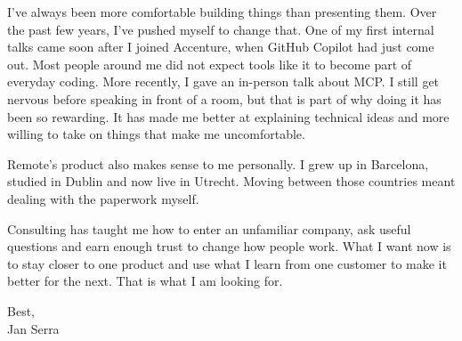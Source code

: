 \documentclass[letterpaper,11pt]{article}
\begin{document}
I've always been more comfortable building things than presenting them. Over the past few years, I've pushed myself to change that. One of my first internal talks came soon after I joined Accenture, when GitHub Copilot had just come out. Most people around me did not expect tools like it to become part of everyday coding. More recently, I gave an in-person talk about MCP. I still get nervous before speaking in front of a room, but that is part of why doing it has been so rewarding. It has made me better at explaining technical ideas and more willing to take on things that make me uncomfortable.

Remote's product also makes sense to me personally. I grew up in Barcelona, studied in Dublin and now live in Utrecht. Moving between those countries meant dealing with the paperwork myself.

Consulting has taught me how to enter an unfamiliar company, ask useful questions and earn enough trust to change how people work. What I want now is to stay closer to one product and use what I learn from one customer to make it better for the next. That is what I am looking for.

\vspace{6pt}
\noindent
Best,\\[10pt]
Jan Serra
\end{document}
